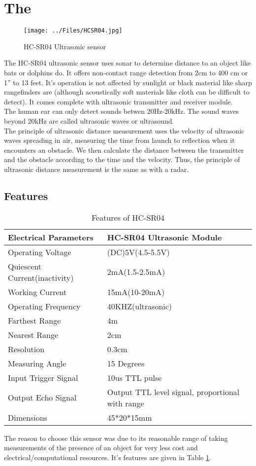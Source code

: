 \section{The \hcsr{} \ultrasonic{}}
\begin{figure}[H]
	\centering
	\texttt{[image: ../Files/HCSR04.jpg]}
	\caption{HC-SR04 Ultrasonic sensor}  \label{fig:HCSR}
\end{figure}
The HC-SR04 ultrasonic sensor uses sonar to determine distance to an object like bats or dolphins do. It offers non-contact range detection from 2cm to 400 cm or 1” to 13 feet. It's operation is not affected by sunlight or black material like sharp rangefinders are (although acoustically soft materials like cloth can be difficult to detect). It comes complete with ultrasonic transmitter and receiver module.\\
The human ear can only detect sounds betwen 20Hz-20kHz. The sound waves beyond 20kHz are called ultrasonic waves or ultrasound.\\
The principle of ultrasonic distance measurement uses the velocity of ultrasonic waves spreading in air, measuring the time from launch to reflection when it encounters an obstacle. We then calculate the distance between the transmitter and the obstacle according to the time and the velocity. Thus, the principle of ultrasonic distance measurement is the same as with a radar.

\subsection{Features}
\begin{table}
	\centering
	\begin{tabular}{|l|l|}
		\hline
		Electrical Parameters &HC-SR04 Ultrasonic Module\\
		\hline
		Operating Voltage &(DC)5V(4.5-5.5V)\\
		\hline
		Quiescent Current(inactivity)  &2mA(1.5-2.5mA)\\
		\hline
		Working Current  &15mA(10-20mA)\\
		\hline
		Operating Frequency &40KHZ(ultrasonic)\\
		\hline
		Farthest Range &4m\\
		\hline
		Nearest Range &2cm\\
		\hline
		Resolution &0.3cm\\
		\hline
		Measuring Angle &15 Degrees\\
		\hline
		Input Trigger Signal &10us TTL pulse\\
		\hline
		Output Echo Signal &Output TTL level signal, proportional
		with range\\
		\hline
		Dimensions &45*20*15mm\\
		\hline

	\end{tabular}
	\caption{Features of HC-SR04}
	\label{tab:FeaturesHCSR}
\end{table}
The reason to choose this sensor was due to its reasonable range of taking measurements of the presence of an object for very less cost and electrical/computational resources. It's features are given in Table \ref{tab:FeaturesHCSR}.
